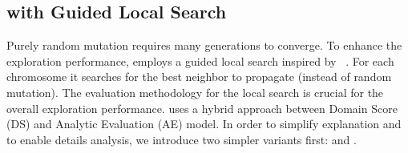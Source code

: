 \subsection{\ga with Guided Local Search}
\label{sec:GALS}

Purely random mutation requires many generations to converge. To enhance the exploration performance, \ga employs a guided local search inspired by ~\cite{wen2011heuristic}. For each chromosome it searches for the best neighbor to propagate (instead of random mutation). The evaluation methodology for the local search is crucial for the overall exploration performance. \ga uses a hybrid approach between Domain Score (DS) and Analytic Evaluation (AE) model. In order to simplify explanation and to enable details analysis, we introduce two simpler variants first: \gads and \gaana.








